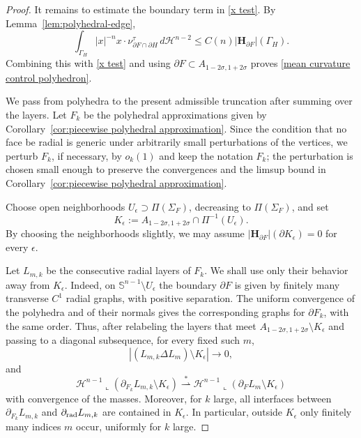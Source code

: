 \documentclass[reqno,11pt]{amsart}
\def\ez{\epsilon}
\def\sz{\sigma}
\newcommand{\HH}{\mathscr H}
\numberwithin{equation}{section}
\theoremstyle{remark}
\begin{document}
\begin{proof}
It remains to estimate the boundary term in \eqref{x test}. By
Lemma~\ref{lem:polyhedral-edge},
\[
\int_{\Gamma_H}
|x|^{-n}x\cdot\nu^\tau_{\partial F\cap\partial H}\,d\HH^{n-2}
\le
C(n)|\mathbf H_{\partial F}|(\Gamma_H).
\]
Combining this with \eqref{x test} and using
$\partial F\subset A_{1-2\sz,1+2\sz}$ proves
\eqref{mean curvature control polyhedron}.

We pass from polyhedra to the present admissible truncation after
summing over the layers. Let $F_k$ be the polyhedral approximations given by
Corollary~\ref{cor:piecewise polyhedral approximation}. Since the condition
that no face be radial is generic under arbitrarily small perturbations of the
vertices, we perturb $F_k$, if necessary, by $o_k(1)$ and keep the notation
$F_k$; the perturbation is chosen small enough to preserve the convergences and
the limsup bound in Corollary~\ref{cor:piecewise polyhedral approximation}.

Choose open neighborhoods $U_\ez\supset\Pi(\Sigma_F)$, decreasing to
$\Pi(\Sigma_F)$, and set
\[
K_\ez:=A_{1-2\sz,1+2\sz}\cap\Pi^{-1}(U_\ez).
\]
By choosing the neighborhoods slightly, we may assume
$|\mathbf H_{\partial F}|(\partial K_\ez)=0$ for every $\ez$.

Let $L_{m,k}$ be the consecutive radial
layers of $F_k$. We shall use only their behavior away from $K_\ez$. Indeed,
on $\mathbb S^{n-1}\setminus U_\ez$ the boundary $\partial F$ is given by
finitely many transverse $C^1$ radial graphs, with positive separation. The
uniform convergence of the polyhedra and of their normals gives the
corresponding graphs for $\partial F_k$, with the same order. Thus, after
relabeling the layers that meet $A_{1-2\sz,1+2\sz}\setminus K_\ez$ and passing
to a diagonal subsequence, for every fixed such $m$,
\[
|(L_{m,k}\Delta L_m)\setminus K_\ez|\to0,
\]
and
\[
\HH^{n-1}\llcorner(\partial_{F_k}L_{m,k}\setminus K_\ez)
\stackrel{*}{\rightharpoonup}
\HH^{n-1}\llcorner(\partial_F L_m\setminus K_\ez)
\]
with convergence of the masses. Moreover, for $k$ large, all interfaces
between $\partial_{F_k}L_{m,k}$ and $\partial_{\rm rad}L_{m,k}$ are contained
in $K_\ez$. In particular, outside $K_\ez$ only finitely many indices $m$
occur, uniformly for $k$ large.


\end{proof}
\end{document}
